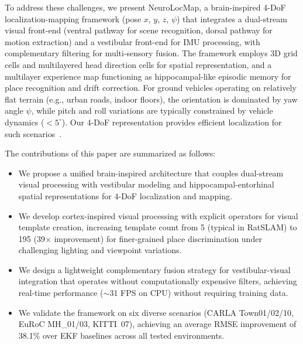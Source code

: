 \documentclass[preprint,12pt]{elsarticle}
\begin{document}
To address these challenges, we present NeuroLocMap, a brain-inspired 4-DoF localization-mapping framework (pose $x$, $y$, $z$, $\psi$) that integrates a dual-stream visual front-end (ventral pathway for scene recognition, dorsal pathway for motion extraction) and a vestibular front-end for IMU processing, with complementary filtering for multi-sensory fusion. The framework employs 3D grid cells and multilayered head direction cells for spatial representation, and a multilayer experience map functioning as hippocampal-like episodic memory for place recognition and drift correction. For ground vehicles operating on relatively flat terrain (e.g., urban roads, indoor floors), the orientation is dominated by yaw angle $\psi$, while pitch and roll variations are typically constrained by vehicle dynamics ($<5^\circ$). Our 4-DoF representation provides efficient localization for such scenarios~\cite{milford2004ratslam,milford2010persistent}.

The contributions of this paper are summarized as follows:
\begin{itemize}
\item We propose a unified brain-inspired architecture that couples dual-stream visual processing with vestibular modeling and hippocampal-entorhinal spatial representations for 4-DoF localization and mapping.
\item We develop cortex-inspired visual processing with explicit operators for visual template creation, increasing template count from 5 (typical in RatSLAM) to 195 (39$\times$ improvement) for finer-grained place discrimination under challenging lighting and viewpoint variations.
\item We design a lightweight complementary fusion strategy for vestibular-visual integration that operates without computationally expensive filters, achieving real-time performance ($\sim$31 FPS on CPU) without requiring training data.
\item We validate the framework on six diverse scenarios (CARLA Town01/02/10, EuRoC MH\_01/03, KITTI~07), achieving an average RMSE improvement of 38.1\% over EKF baselines across all tested environments.
\end{itemize}








\end{document}
